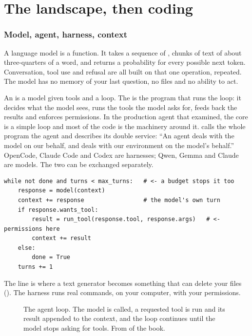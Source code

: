 \documentclass[11pt,a4paper]{article}
\begin{document}
\part{The landscape, then coding}

\section{Model, agent, harness, context}
\label{sec:concepts}

A language model is a function. It takes a sequence of , chunks
of text of about three-quarters of a word, and returns a probability for
every possible next token. Conversation, tool use and refusal are all built
on that one operation, repeated. The model has no memory of your last
question, no files and no ability to act.

An  is a model given tools and a loop. The  is the
program that runs the loop: it decides what the model sees, runs the tools
the model asks for, feeds back the results and enforces permissions. In the
production agent that \textcite{liu2026claudecode} examined, the core is a
simple loop and most of the code is the machinery around it.
\textcite{eren2026agenticcoding} calls the whole program the agent and
describes its double service: ``An agent deals with the model on our behalf,
and deals with our environment on the model's behalf.'' OpenCode, Claude Code
and Codex are harnesses; Qwen, Gemma and Claude are models. The two can be
exchanged separately.

\begin{lstlisting}[caption={The whole idea, in pseudocode}]
while not done and turns < max_turns:   # <- a budget stops it too
    response = model(context)
    context += response                 # the model's own turn
    if response.wants_tool:
        result = run_tool(response.tool, response.args)   # <- permissions here
        context += result
    else:
        done = True
    turns += 1
\end{lstlisting}

The  line is where a text generator becomes something that
can delete your files (). The harness runs real commands, on
your computer, with your permissions.

\begin{figure}[htbp]
\centering
{}
\caption{The agent loop. The model is called, a requested tool is run and its
result appended to the context, and the loop continues until the model stops
asking for tools. From \bkLandscape{} of the book.}
\label{fig:loop}
\end{figure}
\end{document}
